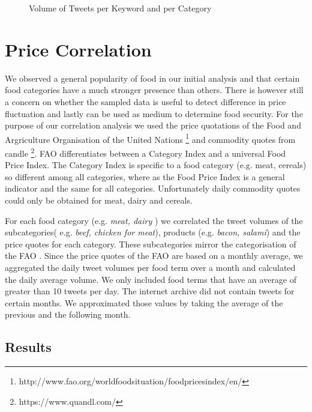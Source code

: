 \begin{figure}[H]
        \caption{Volume of Tweets per Keyword and per Category}\label{fig:distribution}
\end{figure}


\section{Price Correlation}


We observed a general popularity of food in our initial analysis and that certain food categories have a much stronger presence than others. There is however still a concern on whether the sampled data is useful to detect difference in price fluctuation and lastly can  be used as medium to determine food security. For the purpose of our correlation analysis we used the price quotations of the Food and Argriculture Organisation of the United Nations \footnote{http://www.fao.org/worldfoodsituation/foodpricesindex/en/} and commodity quotes from candle \footnote{https://www.quandl.com/}. FAO differentiates between a Category Index and a universal Food Price Index. The Category Index is specific to a food category (e.g. meat, cereals) so different among all categories, where as the Food Price Index is a general indicator and  the same for all categories. Unfortunately daily commodity quotes could only be obtained for meat, dairy and cereals. 

For each food category (e.g. \emph{meat, dairy} ) we correlated the tweet volumes of the subcategories( e.g. \emph{beef, chicken for meat}), products (e.g. \emph{bacon, salami}) and the price quotes for each category. These subcategories mirror the categorisation of the FAO \cite{fao2008}. Since the price quotes of the FAO are based on a monthly average, we aggregated the daily tweet volumes per food term over a month and calculated the daily average volume. We only included food terms that have an average of greater than 10 tweets per day. The internet archive did not contain tweets for certain months. We approximated those values by taking the average of the previous and the following month. 

\subsection{Results} 
\label{corr_results}

